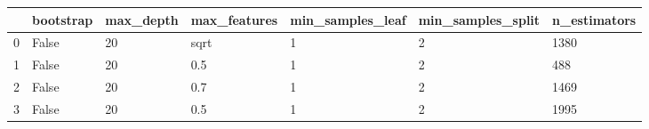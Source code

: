 \begin{tabular}{lllllll}
\toprule
{} & bootstrap & max\_depth & max\_features & min\_samples\_leaf & min\_samples\_split & n\_estimators \\
\midrule
0 &     False &        20 &         sqrt &                1 &                 2 &         1380 \\
1 &     False &        20 &          0.5 &                1 &                 2 &          488 \\
2 &     False &        20 &          0.7 &                1 &                 2 &         1469 \\
3 &     False &        20 &          0.5 &                1 &                 2 &         1995 \\
\bottomrule
\end{tabular}
